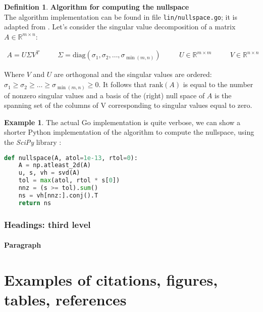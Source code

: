 \documentclass{article}
\theoremstyle{plain}%
\theoremstyle{definition}
\newtheorem{defn}{Definition}[section]
\newtheorem{exmp}{Example}[section]
\theoremstyle{remark}
\def\R{\mathbb{R}}
\newcommand{\diag}[1]{\text{diag}\left(#1\right)}
\newcommand{\mrank}[1]{\text{rank}\left(#1\right)}
\begin{document}
\begin{defn}
  \textbf{Algorithm for computing the nullspace} \\
  The algorithm implementation can be found in file \texttt{lin/nullspace.go}; it is
  adapted from \cite{scipy/ranknullspace}. 
  Let's consider the singular value decomposition of a matrix $A \in \R^{m \times n}$:

  \begin{equation*}
    \begin{aligned}
      A = U \Sigma V^T & \quad & \Sigma = \diag{\sigma_1, \sigma_2, \hdots, \sigma_{\min(m, n)}  } 
       & \quad &  U \in \R^{m \times m} & \quad & V \in \R^{n \times n}
    \end{aligned}
  \end{equation*}

  Where $V$ and $U$ are orthogonal and the singular values are ordered: $\sigma_1 \geq \sigma_2 \geq \hdots \geq \sigma_{\min(m,n)} \geq 0$.
  It follows that $\mrank{A}$ is equal to the number of nonzero singular values and
  a basis of the (right) null space of $A$ is the spanning set of the columns of V
  corresponding to singular values equal to zero. 
\end{defn}

\begin{exmp}
  The actual Go implementation is quite verbose, we can show a shorter Python 
  implementation of the algorithm to compute the nullspace, using the 
  \textit{SciPy} library \cite{scipy/ranknullspace}:

  \begin{lstlisting}[language=python]
def nullspace(A, atol=1e-13, rtol=0):
    A = np.atleast_2d(A)
    u, s, vh = svd(A)
    tol = max(atol, rtol * s[0])
    nnz = (s >= tol).sum()
    ns = vh[nnz:].conj().T
    return ns
    \end{lstlisting}
\end{exmp}




\subsubsection{Headings: third level}

\paragraph{Paragraph}

\section{Examples of citations, figures, tables, references}
\label{sec:others}
\end{document}
